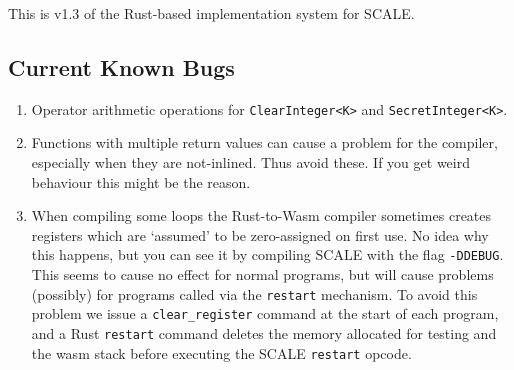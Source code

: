 
This is v1.3 of the Rust-based implementation system for SCALE.

\subsection{Current Known Bugs}
\begin{enumerate}
\item Operator arithmetic operations for  \verb|ClearInteger<K>| and \verb|SecretInteger<K>|.
\item Functions with multiple return values can cause a problem for the compiler, especially
when they are not-inlined. Thus avoid these. If you get weird behaviour this might
be the reason.
\item When compiling some loops the Rust-to-Wasm compiler sometimes creates
	registers which are `assumed' to be zero-assigned on first use.
	No idea why this happens, but you can see it by compiling SCALE with
	the flag \verb|-DDEBUG|. This seems to cause no effect for normal
	programs, but will cause problems (possibly) for programs called
	via the \verb|restart| mechanism. To avoid this problem we issue
	a \verb|clear_register| command at the start of each program,
	and a Rust \verb|restart| command deletes the memory allocated
	for testing and the wasm stack before executing the SCALE
	\verb|restart| opcode.
\end{enumerate}

